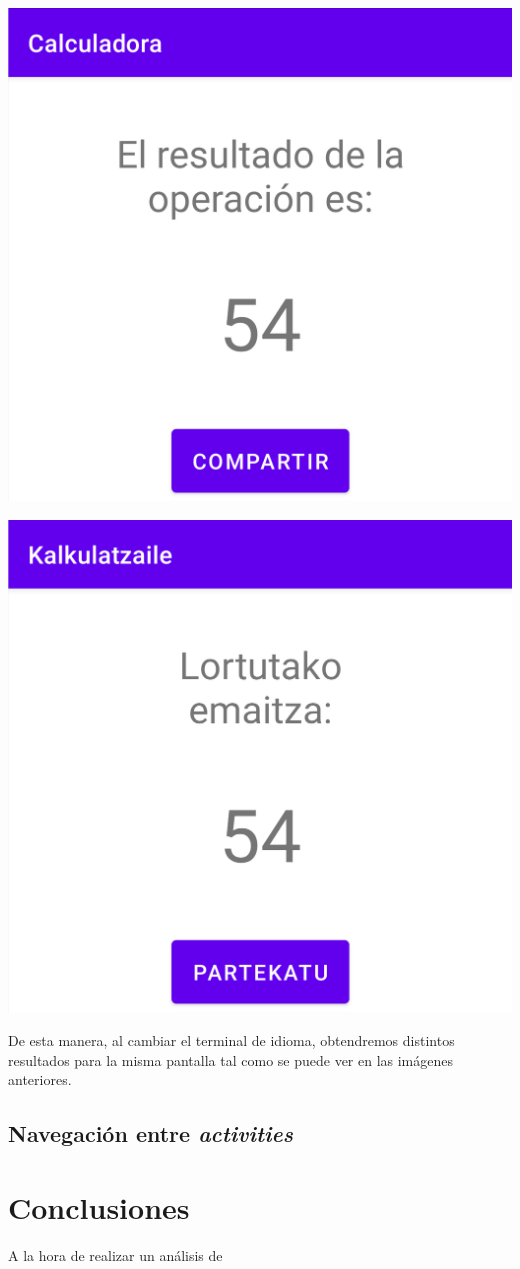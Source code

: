 \documentclass{\ClassPath/viu-tfm-template}
\begin{document}
{\begin{minipage}{0.32\linewidth}
    \includegraphics[frame,width=\linewidth]{img/castellano.png}
\end{minipage}
\hfill
\begin{minipage}{0.32\linewidth}
    \includegraphics[frame,width=\linewidth]{img/euskara.png}
\end{minipage}

}

De esta manera, al cambiar el terminal de idioma, obtendremos distintos resultados para la misma pantalla tal como se puede ver en las imágenes anteriores.


\section{Navegación entre \textit{activities}}



\chapter{Conclusiones}

A la hora de realizar un análisis de
\end{document}

